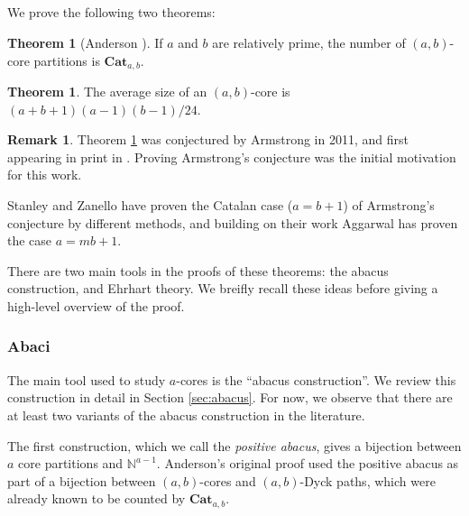 \documentclass{amsart}[12pt]
\theoremstyle{definition}
\newtheorem{theorem}[dummy]{Theorem}
\newtheorem{remark}[dummy]{Remark}
\newcommand{\N}{\mathbb{N}}
\newcommand{\Cat}{\mathbf{Cat}}
\begin{document}
\subsection{}

We prove the following two theorems:

\begin{theorem}[Anderson \cite{anderson}] \label{thm:anderson}
If $a$ and $b$ are relatively prime, the number of
$(a,b)$-core partitions is $\Cat_{a,b}$.
\end{theorem}


\begin{theorem} \label{thm:armstrong}
The average size of an $(a,b)$-core is $(a+b+1)(a-1)(b-1)/24$.
\end{theorem}

\begin{remark} 
Theorem \ref{thm:armstrong} was conjectured by Armstrong in 2011, and first appearing in print in \cite{AHJ}.  Proving Armstrong's conjecture was the initial motivation for this work.  

Stanley and Zanello \cite{SZ} have proven the Catalan case ($a=b+1$) of Armstrong's conjecture by different methods, and building on their work Aggarwal \cite{Aggarwal} has proven the case $a=mb+1$.   
\end{remark}

There are two main tools in the proofs of these theorems: the abacus construction, and Ehrhart theory.  We breifly recall these ideas before giving a high-level overview of the proof.






 
\subsubsection{Abaci} 

The main tool used to study $a$-cores is the ``abacus construction''.  We review this construction in detail in Section \ref{sec:abacus}.  For now, we observe that there are at least two variants of the abacus construction in the literature.  

The first construction, which we call the \emph{positive abacus}, gives a bijection between $a$ core partitions and $\N^{a-1}$.  Anderson's original proof used the positive abacus as part of a bijection between $(a,b)$-cores and $(a,b)$-Dyck paths, which were already known to be counted by $\Cat_{a,b}$.
\end{document}

